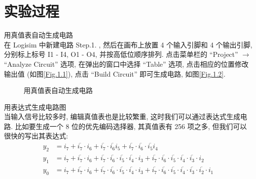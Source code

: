 \documentclass[UTF8,fontset=fandol]{ctexart}
\begin{document}
\section*{实验过程}
\begin{ExSteps}
  \step 用真值表自动生成电路\\
  在 Logisim 中新建电路 Step.1. , 然后在画布上放置 4 个输入引脚和 4 个输出引脚, 分别标上标号 I1 - I4, O1 - O4, 并按高低位顺序排列.
  点击菜单栏的 ``Project'' $\rightarrow$ ``Analyze Circuit'' 选项, 在弹出的窗口中选择 ``Table'' 选项, 点击相应的位置修改输出值 (如图\ref{Fig.1.1}),
  点击 ``Build Circuit'' 即可生成电路, 如图\ref{Fig.1.2}.
  
  \begin{figure}[H]
    \centering
    \label{Fig.1}
    \caption{用真值表自动生成电路}
  \end{figure}

  \step 用表达式生成电路图\\
  当输入信号比较多时, 编辑真值表也是比较繁重, 这时我们可以通过表达式生成电路. 比如要生成一个 8 位的优先编码选择器, 其真值表有 256 项之多, 但我们可以很快的写出其表达式:
  \begin{align*}
      y_2 &= i_7 + \overline{i_7}\cdot i_6 + \overline{i_7}\cdot \overline{i_6}i_5 + \overline{i_7}\cdot \overline{i_6}\cdot \overline{i_5}i_4 \\
      y_1 &= i_7 + \overline{i_7}\cdot i_6 + \overline{i_7}\cdot \overline{i_6}\cdot \overline{i_5}\cdot \overline{i_4}\cdot i_3 + \overline{i_7}\cdot \overline{i_6}\cdot \overline{i_5}\cdot \overline{i_4}\cdot \overline{i_3}\cdot i_2 \\
      y_0 &= i_7 + \overline{i_7}\cdot i_6 + \overline{i_7}\cdot \overline{i_6}\cdot \overline{i_5}\cdot \overline{i_4}\cdot i_3 + \overline{i_7}\cdot \overline{i_6}\cdot \overline{i_5}\cdot \overline{i_4}\cdot \overline{i_3}\cdot \overline{i_2}\cdot i_1 
  \end{align*}


\end{ExSteps}
\end{document}
